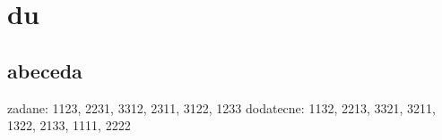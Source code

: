 \documentclass[a4paper]{article}
\begin{document}
\pagestyle{fancy}

\setcounter{section}{3}
\section{du}
\subsection{}


\subsection{}


\subsection{abeceda}
zadane:     1123, 2231, 3312, 2311, 3122, 1233
dodatecne:  1132, 2213, 3321, 3211, 1322, 2133, 1111, 2222
\end{document}
